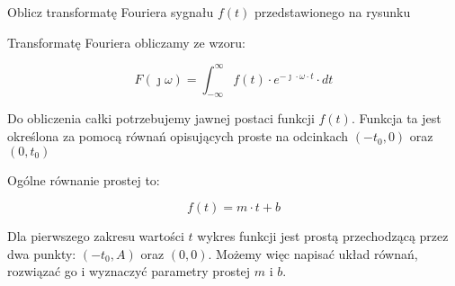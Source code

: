 \begin{task}
Oblicz transformatę Fouriera sygnału $f(t)$ przedstawionego na rysunku

\begin{figure}[H]
\centering
{}
\end{figure}


Transformatę Fouriera obliczamy ze wzoru:

\begin{equation}
F(\jmath \omega )=\int_{-\infty }^{\infty}f(t) \cdot e^{-\jmath \cdot \omega \cdot t}\cdot dt
\end{equation}

Do obliczenia całki potrzebujemy jawnej postaci funkcji $f(t)$. Funkcja ta jest określona za pomocą równań opisujących proste na odcinkach $(-t_{0}, 0)$ oraz $(0, t_{0})$ 

Ogólne równanie prostej to:

\begin{equation}
f(t) = m \cdot t + b
\end{equation}

Dla pierwszego zakresu wartości $t$ wykres funkcji jest prostą przechodzącą przez dwa punkty: $(-t_{0},A)$ oraz $(0,0)$. Możemy więc napisać układ równań, rozwiązać go i wyznaczyć parametry prostej $m$ i $b$.  


\end{task}
